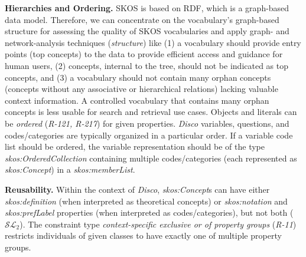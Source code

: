 \documentclass{llncs}
\newenvironment{DL}{
  \vspace{0cm}
  \begin{tabular}{r l}

}{
  \end{tabular}
}
\begin{document}
{{%
\textbf{Hierarchies and Ordering.}
SKOS is based on RDF, which is a graph-based data model. Therefore, we can concentrate on the vocabulary's graph-based structure for assessing the quality of SKOS vocabularies and apply graph- and network-analysis techniques (\emph{structure}) like 
(1) a vocabulary should provide entry points (top concepts) to the data to provide efficient access and guidance for human users,
(2) concepts, internal to the tree, should not be indicated as top concepts, and
(3) a vocabulary should not contain many orphan concepts 
(concepts without any associative or hierarchical relations) lacking valuable context information. A controlled vocabulary that contains many orphan concepts is less usable for search and retrieval use cases.
Objects and literals can be \emph{ordered} (\emph{R-121, R-217}) for given properties.
\emph{Disco }variables, questions, and codes/categories are typically organized in a particular order. 
If a variable code list should be ordered, the variable representation should be of the type \emph{skos:OrderedCollection} containing multiple codes/categories (each represented as \emph{skos:Concept}) in a \emph{skos:memberList}. 

\textbf{Reusability.}
Within the context of \emph{Disco}, \emph{skos:Concept}s can have either \emph{skos:definition} (when interpreted as theoretical concepts) or \emph{skos:notation} and \emph{skos:prefLabel} properties (when interpreted as codes/categories), but not both ($\mathcal{SL}_{2}$).
The constraint type \emph{context-specific exclusive or of property groups} (\emph{R-11})
restricts individuals of given classes to have exactly one of multiple property groups.


}}
\end{document}
